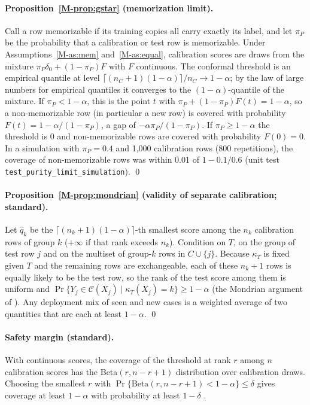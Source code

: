 \documentclass[11pt]{article}
\begin{document}
\paragraph{Proposition~\ref{M-prop:gstar} (memorization limit).} Call a row memorizable if its training copies all carry exactly its label, and let $\pi_P$ be the probability that a calibration or test row is memorizable. Under Assumptions~\ref{M-as:mem} and~\ref{M-as:equal}, calibration scores are draws from the mixture $\pi_P\delta_0+(1-\pi_P)F$ with $F$ continuous. The conformal threshold is an empirical quantile at level $\lceil(n_C+1)(1-\alpha)\rceil/n_C\to1-\alpha$; by the law of large numbers for empirical quantiles it converges to the $(1-\alpha)$-quantile of the mixture. If $\pi_P<1-\alpha$, this is the point $t$ with $\pi_P+(1-\pi_P)F(t)=1-\alpha$, so a non-memorizable row (in particular a new row) is covered with probability $F(t)=1-\alpha/(1-\pi_P)$, a gap of $-\alpha\pi_P/(1-\pi_P)$. If $\pi_P\ge1-\alpha$ the threshold is $0$ and non-memorizable rows are covered with probability $F(0)=0$. In a simulation with $\pi_P=0.4$ and 1,000 calibration rows (800 repetitions), the coverage of non-memorizable rows was within 0.01 of $1-0.1/0.6$ (unit test \texttt{test\_purity\_limit\_simulation}). \qed

\paragraph{Proposition~\ref{M-prop:mondrian} (validity of separate calibration; standard).} Let $\hat q_k$ be the $\lceil(n_k+1)(1-\alpha)\rceil$-th smallest score among the $n_k$ calibration rows of group $k$ ($+\infty$ if that rank exceeds $n_k$). Condition on $T$, on the group of test row $j$ and on the multiset of group-$k$ rows in $C\cup\{j\}$. Because $\kappa_T$ is fixed given $T$ and the remaining rows are exchangeable, each of these $n_k+1$ rows is equally likely to be the test row, so the rank of the test score among them is uniform and $\Pr\{Y_j\in\mathcal C(X_j)\mid\kappa_T(X_j)=k\}\ge1-\alpha$ (the Mondrian argument of \cite{M-vovk2022}). Any deployment mix of seen and new cases is a weighted average of two quantities that are each at least $1-\alpha$. \qed

\paragraph{Safety margin (standard).} With continuous scores, the coverage of the threshold at rank $r$ among $n$ calibration scores has the Beta$(r,n-r+1)$ distribution over calibration draws. Choosing the smallest $r$ with $\Pr\{\mathrm{Beta}(r,n-r+1)<1-\alpha\}\le\delta$ gives coverage at least $1-\alpha$ with probability at least $1-\delta$ \cite{M-vovk2012}.
\end{document}
